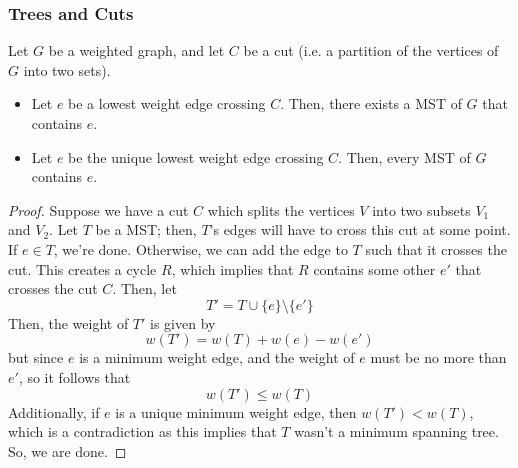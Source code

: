 \documentclass[letterpaper]{article}
\begin{document}
\subsubsection{Trees and Cuts}
\begin{lemma}{}{}
    Let $G$ be a weighted graph, and let $C$ be a cut (i.e. a partition of the vertices of $G$ into two sets). 
    \begin{itemize}
        \item Let $e$ be a lowest weight edge crossing $C$. Then, there exists a MST of $G$ that contains $e$. 
        \item Let $e$ be the unique lowest weight edge crossing $C$. Then, every MST of $G$ contains $e$. 
    \end{itemize}
\end{lemma}

\begin{mdframed}[]
    \begin{proof}
        Suppose we have a cut $C$ which splits the vertices $V$ into two subsets $V_1$ and $V_2$. Let $T$ be a MST; then, $T$'s edges will have to cross this cut at some point. If $e \in T$, we're done. Otherwise, we can add the edge to $T$ such that it crosses the cut. This creates a cycle $R$, which implies that $R$ contains some other $e'$ that crosses the cut $C$. Then, let
        \[T' = T \cup \{e\} \setminus \{e'\}\]
        Then, the weight of $T'$ is given by 
        \[w(T') = w(T) + w(e) - w(e')\]
        but since $e$ is a minimum weight edge, and the weight of $e$ must be no more than $e'$, so it follows that 
        \[w(T') \leq w(T)\] 
        Additionally, if $e$ is a unique minimum weight edge, then $w(T') < w(T)$, which is a contradiction as this implies that $T$ wasn't a minimum spanning tree. So, we are done. 
    \end{proof}
\end{mdframed}
\end{document}
